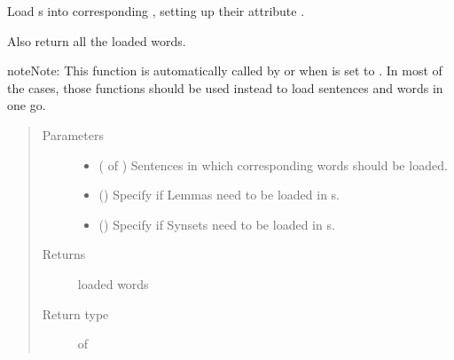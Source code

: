 \documentclass[letterpaper,10pt,english]{sphinxmanual}
\begin{document}

\begin{fulllineitems}
\label{\detokenize{load:loacore.load.word_load.load_words_in_sentences}}
Load  s into corresponding , setting up their attribute .

Also return all the loaded words.

\begin{sphinxadmonition}{note}{Note:}
This function is automatically called by  or
 when  is set to .
In most of the cases, those functions should be used instead to load sentences and words in one go.
\end{sphinxadmonition}
\begin{quote}\begin{description}
\item[{Parameters}] \leavevmode\begin{itemize}
\item {} 
 ( of ) \textendash{} Sentences in which corresponding words should be loaded.

\item {} 
 () \textendash{} Specify if Lemmas need to be loaded in  s.

\item {} 
 () \textendash{} Specify if Synsets need to be loaded in  s.

\end{itemize}

\item[{Returns}] \leavevmode
loaded words

\item[{Return type}] \leavevmode
{} of 

\end{description}\end{quote}

\end{fulllineitems}
\end{document}
